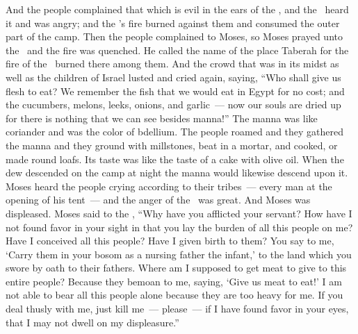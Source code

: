 
\begin{inparaenum}
   And the people complained that which is evil in the ears of the \lord, and the \lord\ heard it and was angry; and the \lord's fire burned against them and consumed the outer part of the camp.%
   Then the people complained to Moses, so Moses prayed unto the \lord\ and the fire was quenched.%
   He called the name of the place Taberah for the fire of the \lord\ burned there among them.%
   And the crowd that was in its midst as well as the children of Israel lusted and cried again, saying, ``Who shall give us flesh to eat?%
   We remember the fish that we would eat in Egypt for no cost; and the cucumbers, melons, leeks, onions, and garlic~---%
   now our souls are dried up for there is nothing that we can see besides manna!''%
   The manna was like coriander and was the color of bdellium.%
   The people roamed and they gathered the manna and they ground with millstones, beat in a mortar, and cooked, or made round loafs. Its taste was like the taste of a cake with olive oil.%
   When the dew descended on the camp at night the manna would likewise descend upon it.%
   Moses heard the people crying according to their tribes~--- every man at the opening of his tent~--- and the anger of the \lord\ was great. And Moses was displeased.%
   Moses said to the \lord, ``Why have you afflicted your servant? How have I not found favor in your sight in that you lay the burden of all this people on me?%
   Have I conceived all this people? Have I given birth to them? You say to me, `Carry them in your bosom as a nursing father the infant,' to the land which you swore by oath to their fathers.%
   Where am I supposed to get meat to give to this entire people? Because they bemoan to me, saying, `Give us meat to eat!'%
   I am not able to bear all this people alone because they are too heavy for me.%
   If you deal thusly with me, just kill me~--- please~--- if I have found favor in your eyes, that I may not dwell on my displeasure.''%


\end{inparaenum}

